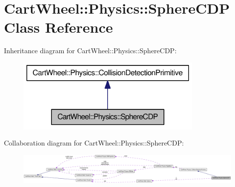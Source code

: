 \hypertarget{classCartWheel_1_1Physics_1_1SphereCDP}{
\section{CartWheel::Physics::SphereCDP Class Reference}
\label{classCartWheel_1_1Physics_1_1SphereCDP}
}


Inheritance diagram for CartWheel::Physics::SphereCDP:\nopagebreak
\begin{figure}[H]
\begin{center}
\leavevmode
\includegraphics[width=258pt]{classCartWheel_1_1Physics_1_1SphereCDP__inherit__graph}
\end{center}
\end{figure}


Collaboration diagram for CartWheel::Physics::SphereCDP:\nopagebreak
\begin{figure}[H]
\begin{center}
\leavevmode
\includegraphics[width=400pt]{classCartWheel_1_1Physics_1_1SphereCDP__coll__graph}
\end{center}
\end{figure}
